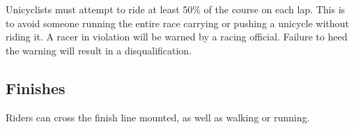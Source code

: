 Unicyclists must attempt to ride at least 50\% of the course on each lap.
This is to avoid someone running the entire race carrying or pushing a unicycle without riding it.
A racer in violation will be warned by a racing official.
Failure to heed the warning will result in a disqualification.

\subsection{Finishes}

Riders can cross the finish line mounted, as well as walking or running.
